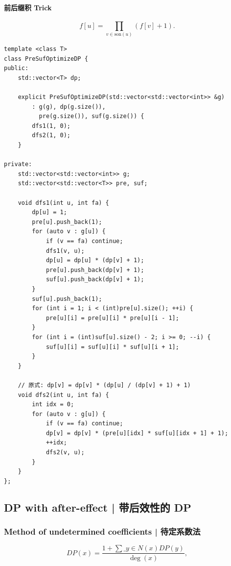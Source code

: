         \paragraph{前后缀积 Trick}
        \[
            f[u] = \prod_{v \in \text{son}(u)} (f[v] + 1).
        \]

        \begin{lstlisting}
template <class T>
class PreSufOptimizeDP {
public:
    std::vector<T> dp;

    explicit PreSufOptimizeDP(std::vector<std::vector<int>> &g)
        : g(g), dp(g.size()),
          pre(g.size()), suf(g.size()) {
        dfs1(1, 0);
        dfs2(1, 0);
    }

private:
    std::vector<std::vector<int>> g;
    std::vector<std::vector<T>> pre, suf;

    void dfs1(int u, int fa) {
        dp[u] = 1;
        pre[u].push_back(1);
        for (auto v : g[u]) {
            if (v == fa) continue;
            dfs1(v, u);
            dp[u] = dp[u] * (dp[v] + 1);
            pre[u].push_back(dp[v] + 1);
            suf[u].push_back(dp[v] + 1);
        }
        suf[u].push_back(1);
        for (int i = 1; i < (int)pre[u].size(); ++i) {
            pre[u][i] = pre[u][i] * pre[u][i - 1];
        }
        for (int i = (int)suf[u].size() - 2; i >= 0; --i) {
            suf[u][i] = suf[u][i] * suf[u][i + 1];
        }
    }

    // 原式: dp[v] = dp[v] * (dp[u] / (dp[v] + 1) + 1)
    void dfs2(int u, int fa) {
        int idx = 0;
        for (auto v : g[u]) {
            if (v == fa) continue;
            dp[v] = dp[v] * (pre[u][idx] * suf[u][idx + 1] + 1);
            ++idx;
            dfs2(v, u);
        }
    }
};
        \end{lstlisting}

\subsection{DP with after-effect | 带后效性的 DP}


    \subsubsection{Method of undetermined coefficients | 待定系数法}
        \[
            DP(x) = \frac{1 + \sum\_{y \in N(x)} DP(y)}{\deg(x)},
        \]

